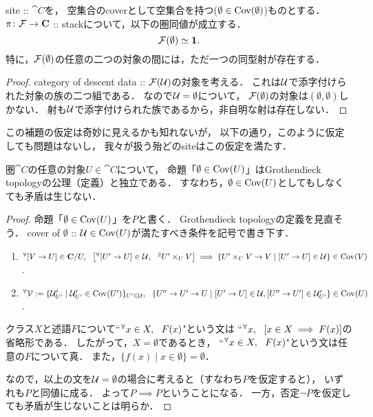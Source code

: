 \documentclass[a4paper, dvipdfmx]{jsarticle}
\begin{document}
\begin{Lemma}
    site :: $\cat{C}$を，
    空集合のcoverとして空集合を持つ($\emptyset \in \operatorname{Cov}(\emptyset)$)ものとする．
    $\pi \colon \mathcal{F} \to \mathbf{C}$ :: stackについて，以下の圏同値が成立する．
    \[ \mathcal{F}( \emptyset ) \simeq \mathbf{1}. \]
    特に，$\mathcal{F}(\emptyset)$の任意の二つの対象の間には，ただ一つの同型射が存在する．
\end{Lemma}
\begin{proof}
    category of descent data :: $\mathcal{F}(\mathcal{U})$の対象を考える．
    これは$\mathcal{U}$で添字付けられた対象の族の二つ組である．
    なので$\mathcal{U}=\emptyset$について，
    $\mathcal{F}(\emptyset)$の対象は$(\emptyset, \emptyset)$しかない．
    射も$\mathcal{U}$で添字付けられた族であるから，非自明な射は存在しない．
\end{proof}

この補題の仮定は奇妙に見えるかも知れないが，
以下の通り，このように仮定しても問題はないし，
我々が扱う殆どのsiteはこの仮定を満たす．

\begin{Claim}
    圏$\cat{C}$の任意の対象$U \in \cat{C}$について，
    命題「$\emptyset \in \operatorname{Cov}(U)$」はGrothendieck topologyの公理（定義）と独立である．
    すなわち，$\emptyset \in \operatorname{Cov}(U)$としてもしなくても矛盾は生じない．
\end{Claim}
\begin{proof}
    命題「$\emptyset \in \operatorname{Cov}(U)$」を$P$と書く．
    Grothendieck topologyの定義を見直そう．
    cover of $\emptyset$ :: $\mathcal{U} \in \operatorname{Cov}(U)$が満たすべき条件を記号で書き下す．
    \begin{enumerate}[label=(\alph*)]
        \item
            ${}^{\forall} [V \to U] \in \mathbf{C}/U,~~
            \left[ {}^{\forall} [U' \to U] \in \mathcal{U},~~ {}^{\exists} U' \times_{U} V \right]
            \implies \{ U' \times_{U} V \to V \mid [U' \to U] \in \mathcal{U} \} \in \operatorname{Cov}(V)$.

        \item ${}^{\forall} \mathcal{V}:=\{ \mathcal{U}'_{U'} \mid \mathcal{U}'_{U'} \in \operatorname{Cov}(U')\}_{U' \in \mathcal{U}},~~
                \{ U'' \to U' \to U \mid
                    [U' \to U] \in \mathcal{U}, [U'' \to U'] \in \mathcal{U}'_{U'} \} \in \operatorname{Cov}(U)$.
    \end{enumerate}
    クラス$X$と述語$F$について``${}^{\forall} x \in X,~~ F(x)$"という文は
    ``${}^{\forall} x,~~ \left[x \in X \implies F(x)\right]$の省略形である．
    したがって，$X=\emptyset$であるとき，
    ``${}^{\forall} x \in X,~~ F(x)$"という文は任意の$F$について真．
    また，$\{ f(x) \mid x \in \emptyset \}=\emptyset$．

    なので，以上の文を$\mathcal{U}=\emptyset$の場合に考えると（すなわち$P$を仮定すると），
    いずれも$P$と同値に成る．
    よって$P \implies P$ということになる．
    一方，否定$\lnot P$を仮定しても矛盾が生じないことは明らか．
\end{proof}
\end{document}
